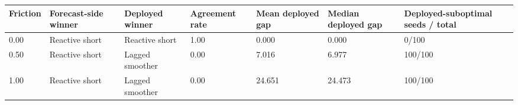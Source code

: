 \begin{tabular}{lllllll}
\toprule
Friction & Forecast-side winner & Deployed winner & Agreement rate & Mean deployed gap & Median deployed gap & Deployed-suboptimal seeds / total \\
\midrule
0.00 & Reactive short & Reactive short & 1.00 & 0.000 & 0.000 & 0/100 \\
0.50 & Reactive short & Lagged smoother & 0.00 & 7.016 & 6.977 & 100/100 \\
1.00 & Reactive short & Lagged smoother & 0.00 & 24.651 & 24.473 & 100/100 \\
\bottomrule
\end{tabular}
